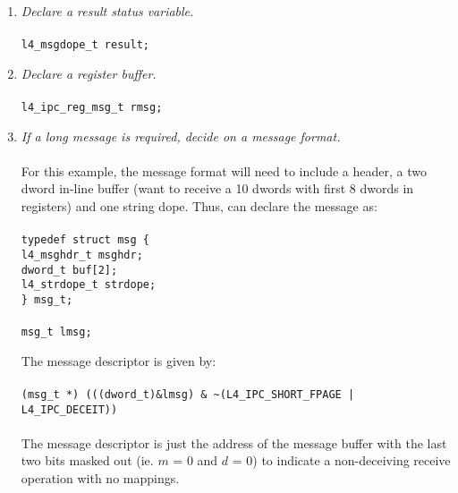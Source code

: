 \begin{enumerate}

\item \emph{Declare a result status variable.} \\ \\
  \hspace*{20pt} {\footnotesize\verb+l4_msgdope_t result;+}
  
\item \emph{Declare a register buffer.} \\ \\
  \hspace*{20pt} {\footnotesize\verb+l4_ipc_reg_msg_t rmsg;+} \\ 
  
\item \emph{If a long message is required, decide on a message format.}
  \\ \\ \hspace*{10pt}
  For this example, the message format will need to include a header,
  a two dword in-line buffer (want to receive a 10 dwords with first
  8 dwords in registers) and one string dope. Thus, can declare the 
  message as: \\ \\
  \hspace*{20pt} {\footnotesize\verb+typedef struct msg {+} \\
    \hspace*{60pt} {\footnotesize\verb+l4_msghdr_t msghdr;+} \\
    \hspace*{60pt} {\footnotesize\verb+dword_t buf[2];+} \\
    \hspace*{60pt} {\footnotesize\verb+l4_strdope_t strdope;+}\\
    \hspace*{20pt} {\footnotesize\verb+} msg_t;+} \\ \\
  \hspace*{20pt} {\footnotesize\verb+msg_t lmsg;+}
  
  \hspace*{10pt} The message descriptor is given by: \\ \\
  \hspace*{20pt} {\footnotesize\verb+(msg_t *) (((dword_t)&lmsg) & ~(L4_IPC_SHORT_FPAGE | L4_IPC_DECEIT))+} \\ \\
  \hspace*{10pt} The message descriptor is just the address of 
  the message buffer with the last two bits masked out (ie. $m$ =
  0 and $d$ = 0) to indicate a non-deceiving receive 
  operation with no mappings.
  

\end{enumerate}
